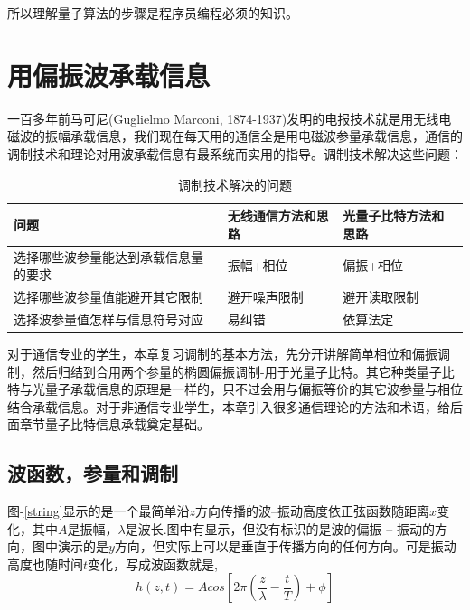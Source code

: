 \documentclass{ctexbook}
\begin{document}
所以理解量子算法的步骤是程序员编程必须的知识。

\chapter{用偏振波承载信息}\label{c-modulation}
一百多年前马可尼(Guglielmo Marconi, 1874-1937)发明的电报技术就是用无线电磁波的振幅承载信息，我们现在每天用的通信全是用电磁波参量承载信息，通信的调制技术和理论对用波承载信息有最系统而实用的指导。调制技术解决这些问题：
%
\begin{table}[]\label{t-modulation-steps}
    \caption{调制技术解决的问题}
\begin{tabular}{|l|l|l|}
\hline
问题 & 无线通信方法和思路 & 光量子比特方法和思路   \\ \hline
选择哪些波参量能达到承载信息量的要求 &  振幅+相位 &  偏振+相位 \\ \hline
选择哪些波参量值能避开其它限制 & 避开噪声限制 &  避开读取限制  \\ \hline
选择波参量值怎样与信息符号对应 & 易纠错 & 依算法定 \\
\hline
\end{tabular}
\end{table}

对于通信专业的学生，本章复习调制的基本方法，先分开讲解简单相位和偏振调制，然后归结到合用两个参量的椭圆偏振调制-用于光量子比特。其它种类量子比特与光量子承载信息的原理是一样的，只不过会用与偏振等价的其它波参量与相位结合承载信息。对于非通信专业学生，本章引入很多通信理论的方法和术语，给后面章节量子比特信息承载奠定基础。

\section{波函数，参量和调制}
图-\ref{string}显示的是一个最简单沿$z$方向传播的波--振动高度依正弦函数随距离$x$变化，其中$A$是振幅，$\lambda$是波长.图中有显示，但没有标识的是波的偏振 -- 振动的方向，图中演示的是$y$方向，但实际上可以是垂直于传播方向的任何方向。可是振动高度也随时间$t$变化，写成波函数就是,
\begin{equation}\label{e-hWave}
    h(z,t) = A cos[2\pi (\frac z \lambda - \frac t T) +\phi]
\end{equation}
\end{document}
